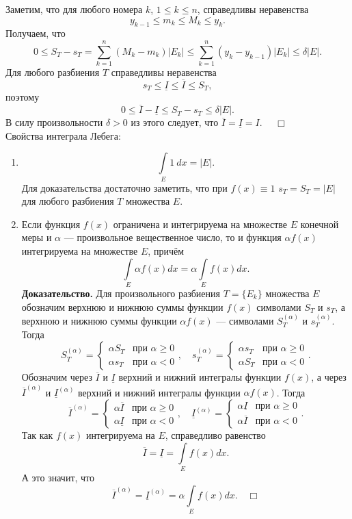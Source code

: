 \documentclass[12pt,a4paper, titlepage]{article}
\begin{document}
Заметим, что для любого номера $k$, $1 \leqslant k \leqslant n$, справедливы неравенства
$$
y_{k-1} \leqslant m_k \leqslant M_k \leqslant y_k.
$$
Получаем, что 
$$
0 \leqslant S_T - s_T = \sum_{k=1}^n (M_k - m_k) |E_k| \leqslant \sum_{k=1}^n (y_k - y_{k-1}) |E_k| \leqslant \delta |E|.
$$
Для любого разбиения $T$ справедливы неравенства
$$
s_T \leqslant \underline{I} \leqslant \overline{I} \leqslant S_T,
$$
поэтому
$$
0 \leqslant \overline{I} - \underline{I} \leqslant S_T - s_T \leqslant \delta |E|.
$$
В силу произвольности $\delta > 0$ из этого следует, что $\overline{I} = \underline{I} = I$. $\quad \Box$\\

Свойства интеграла Лебега:

\begin{enumerate}
\item 
$$
\int\limits_E 1 \ dx = |E|.
$$
Для доказательства достаточно заметить, что при $f(x) \equiv 1$ $s_T = S_T = |E|$ для любого разбиения $T$ множества $E$. 

\item Если функция $f(x)$ ограничена и интегрируема на множестве $E$ конечной меры и $\alpha$ --- произвольное вещественное число, то и функция $\alpha f(x)$ интегрируема на множестве $E$, причём
$$
\int\limits_E \alpha f(x) dx = \alpha \int\limits_E f(x) dx.
$$
\textbf{Доказательство.} Для произвольного разбиения $T = \lbrace E_k \rbrace$ множества $E$ обозначим верхнюю и нижнюю суммы функции $f(x)$ символами $S_T$ и $s_T$, а верхнюю и нижнюю суммы функции $\alpha f(x)$ --- символами $S_T^{(\alpha)}$ и $s_T^{(\alpha)}$. Тогда
$$
S_T^{(\alpha)}=\begin{cases}
\alpha S_T &\text{при $\alpha \geqslant 0$}\\
\alpha s_T &\text{при $\alpha < 0$}
\end{cases}, \quad
s_T^{(\alpha)}=\begin{cases}
\alpha s_T &\text{при $\alpha \geqslant 0$}\\
\alpha S_T &\text{при $\alpha < 0$}
\end{cases}.
$$
Обозначим через $\overline{I}$ и $\underline{I}$ верхний и нижний интегралы функции $f(x)$, а через $\overline{I}^{(\alpha)}$ и $\underline{I}^{(\alpha)}$ верхний и нижний интегралы функции $\alpha f(x)$. Тогда
$$
\overline{I}^{(\alpha)}=\begin{cases}
\alpha \overline{I} &\text{при $\alpha \geqslant 0$}\\
\alpha \underline{I} &\text{при $\alpha < 0$}
\end{cases}, \quad
\underline{I}^{(\alpha)}=\begin{cases}
\alpha \underline{I} &\text{при $\alpha \geqslant 0$}\\
\alpha \overline{I} &\text{при $\alpha < 0$}
\end{cases}.
$$
Так как $f(x)$ интегрируема на $E$, справедливо равенство
$$
\overline{I} = \underline{I} = \int\limits_E f(x) dx.
$$
А это значит, что
$$
\overline{I}^{(\alpha)} = \underline{I}^{(\alpha)} = \alpha \int\limits_E f(x) dx. \quad \Box
$$


\end{enumerate}
\end{document}
